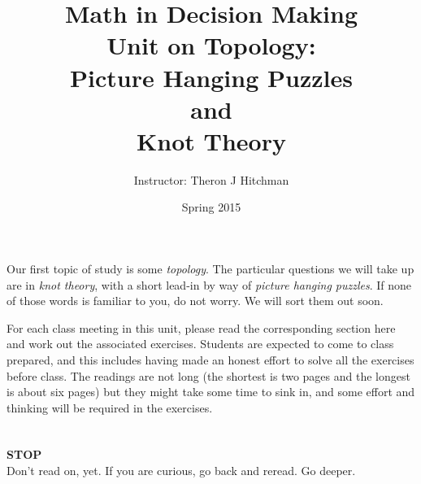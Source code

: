 \documentclass[12pt]{article}
\begin{document}
\title{Math in Decision Making\\ Unit on Topology:\\ 
Picture Hanging Puzzles\\ and\\ Knot Theory}
\author{Instructor: Theron J Hitchman}
\date{Spring 2015}

\maketitle

Our first topic of study is some \emph{topology}. The particular questions we will take up are in \emph{knot theory}, with a short lead-in by way of \emph{picture hanging puzzles}. If none of those words is familiar to you, do not worry. We will sort them out soon.

For each class meeting in this unit, please read the corresponding section here and work out the associated exercises. Students are expected to come to class prepared, and this includes having made an honest effort to solve all the exercises before class. The readings are not long (the shortest is two pages and the longest is about six pages) but they might take some time to sink in, and some effort and thinking will be required in the exercises.

\newpage
$\phantom{Theron J Hitchman}$
\newpage


{\Huge \textbf{STOP}}\\[1in]

Don't read on, yet. If you are curious, go back and reread. Go deeper.
\newpage
$\phantom{Theron J Hitchman}$

\newpage
$\phantom{Theron J Hitchman}$
\newpage

\newpage
$\phantom{Theron J Hitchman}$
\newpage



\newpage
$\phantom{Theron J Hitchman}$
\newpage

\newpage
$\phantom{Theron J Hitchman}$
\newpage

\newpage
$\phantom{Theron J Hitchman}$
\newpage



\end{document}
